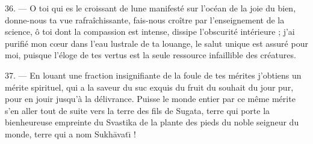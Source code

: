 \documentclass[a4paper, 11pt, oneside, french]{article}
\begin{document}
36. --- O toi qui es le croissant de lune manifesté sur l'océan de la joie du bien, donne-nous ta vue rafraîchissante, fais-nous croître par l'enseignement de la science, ô toi dont la compassion est intense, dissipe l'obscurité intérieure ; j'ai purifié mon cœur dans l'eau lustrale de ta louange, le salut unique est assuré pour moi, puisque l'éloge de tes vertus est la seule ressource infaillible des créatures.

37. --- En louant une fraction insignifiante de la foule de tes mérites j'obtiens un mérite spirituel, qui a la saveur du suc exquis du fruit du souhait du jour pur, pour en jouir jusqu'à la délivrance. Puisse le monde entier par ce même mérite s'en aller tout de suite vers la terre des fils de Sugata, terre qui porte la bienheureuse empreinte du Svastika de la plante des pieds du noble seigneur du monde, terre qui a nom Sukh\={a}vat\={\i} !
\clearpage
\end{document}
